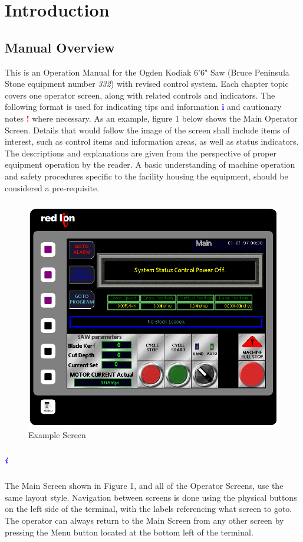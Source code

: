 \chapter{Introduction}

\section{Manual Overview}

This is an Operation Manual for the Ogden Kodiak 6'6" Saw (Bruce Peninsula Stone equipment number \textit{332}) with revised control system. Each chapter topic covers one operator screen, along with related controls and indicators. The following format is used for indicating tips and information \textbf{\LARGE\textcolor{blue}{i}} and cautionary notes  \textbf{{\LARGE\textcolor{red}{!}}} where necessary. As an example, figure 1 below shows the Main Operator Screen. Details that would follow the image of the screen shall include items of interest, such as control items and information areas, as well as status indicators. The descriptions and explanations are given from the perspective of proper equipment operation by the reader. A basic understanding of machine operation and safety procedures specific to the facility housing the equipment, should be considered a pre-requisite.
\paragraph{}
\begin{figure}
		\centering
		\includegraphics[width=0.5\linewidth]{screen-captures/main/main-full}
		\caption{Example Screen}
		\label{fig:example-screen}
\end{figure}
\paragraph{}
\paragraph{\textbf{\LARGE \textcolor{blue}{i}}}The Main Screen shown in Figure 1, and all of the Operator Screens, use the same layout style. Navigation between screens is done using the physical buttons on the left side of the terminal, with the labels referencing what screen to goto. The operator can always return to the Main Screen from any other screen by pressing the Menu button located at the bottom left of the terminal.

